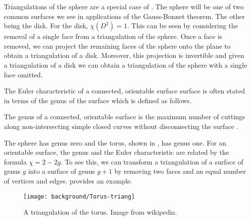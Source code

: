 Triangulations of the sphere are a special case of .
The sphere will be one of two common surfaces we see in applications
of the Gauss-Bonnet theorem. The other being the disk.
For the disk, $\chi(D^2)=1$. This can be seen by considering
the removal of a single face from a triangulation of the sphere.
Once a face is removed, we can project the remaining faces of the sphere
onto the plane to obtain a triangulation of a disk. Moreover, this projection
is invertible and given a triangulation of a disk we can obtain a triangulation
of the sphere with a single face omitted.

The Euler characteristic of a connected, orientable surface surface is often 
stated in terms of the genus of the surface which is defined as follows.
\begin{definition}\label{def:genus}
	The genus of a connected, orientable surface is the maximum number of
	cuttings along non-intersecting simple closed curves without disconnecting
	the surface \cite{munkres}.
\end{definition}

The sphere has genus zero and the torus, shown in , has genus one.
For an orientable surface, the genus and the Euler characteristic are related by
the formula $\chi=2-2g$. To see this, we can transform a triangulation of a surface of
genus $g$ into a surface of genus $g+1$ by removing two faces and an equal number
of vertices and edges.  provides an example.



\begin{figure}[htb]
\centering
\texttt{[image: background/Torus-triang]}
\caption{A triangulation of the torus. Image from wikipedia.}
\label{fig:triangulated-torus}
\end{figure}

